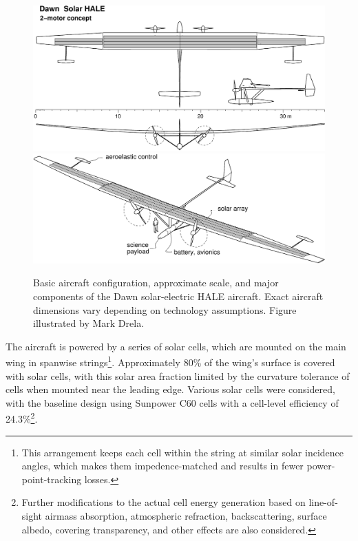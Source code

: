 \begin{figure}[h]
    \centering
    \includegraphics[width=\textwidth]{../figures/dawn1_3view.pdf}
    \includegraphics[width=\textwidth]{../figures/dawn1b.pdf}
    \caption{Basic aircraft configuration, approximate scale, and major components of the Dawn solar-electric HALE aircraft. Exact aircraft dimensions vary depending on technology assumptions. Figure illustrated by Mark Drela.}
    \label{fig:dawn_overview}
\end{figure}


The aircraft is powered by a series of solar cells, which are mounted on the main wing in spanwise strings\footnote{This arrangement keeps each cell within the string at similar solar incidence angles, which makes them impedence-matched and results in fewer power-point-tracking losses.}. Approximately 80\% of the wing's surface is covered with solar cells, with this solar area fraction limited by the curvature tolerance of cells when mounted near the leading edge. Various solar cells were considered, with the baseline design using Sunpower C60 cells with a cell-level efficiency of 24.3\%\footnote{Further modifications to the actual cell energy generation based on line-of-sight airmass absorption, atmospheric refraction, backscattering, surface albedo, covering transparency, and other effects are also considered.}.

